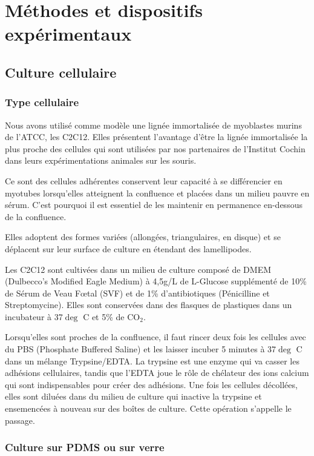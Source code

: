 \documentclass{report}
\begin{document}
\chapter{Méthodes et dispositifs expérimentaux}

\section{Culture cellulaire}
	\subsection{Type cellulaire}
	Nous avons utilisé comme modèle une lignée immortalisée de myoblastes murins de l'ATCC, les C2C12. Elles présentent l'avantage d'être la lignée immortalisée la plus proche des cellules qui sont utilisées par nos partenaires de l'Institut Cochin dans leurs expérimentations animales sur les souris. 
	
	Ce sont des cellules adhérentes conservent leur capacité à se différencier en myotubes lorsqu'elles atteignent la confluence et placées dans un milieu pauvre en sérum. C'est pourquoi il est essentiel de les maintenir en permanence en-dessous de la confluence. 
	
	Elles adoptent des formes variées (allongées, triangulaires, en disque) et se déplacent sur leur surface de culture en étendant des lamellipodes. 
	
	Les C2C12 sont cultivées dans un milieu de culture composé de DMEM (Dulbecco's Modified Eagle Medium) à 4,5g/L de L-Glucose supplémenté de 10\% de Sérum de Veau F\oe tal (SVF) et de 1\% d'antibiotiques (Pénicilline et Streptomycine). Elles sont conservées dans des flasques de plastiques dans un incubateur à 37$\deg$ C et 5\% de CO$_2$. 
	
	
	Lorsqu'elles sont proches de la confluence, il faut rincer deux fois les cellules avec du PBS (Phosphate Buffered Saline) et les laisser incuber 5 minutes à 37$\deg$ C dans un mélange Trypsine/EDTA. La trypsine est une enzyme qui va casser les adhésions cellulaires, tandis que l'EDTA joue le rôle de chélateur des ions calcium qui sont indispensables pour créer des adhésions. Une fois les cellules décollées, elles sont diluées dans du milieu de culture qui inactive la trypsine et ensemencées à nouveau sur des boîtes de culture. Cette opération s'appelle le passage. 
	 
	\subsection{Culture sur PDMS ou sur verre}
\end{document}
